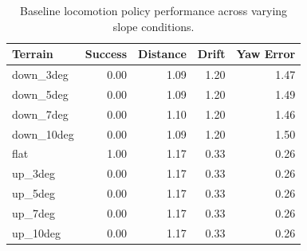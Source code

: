\begin{table}[h]
\centering
\begin{tabular}{lrrrr}
\hline
Terrain & Success & Distance & Drift & Yaw Error \\
\hline
down_3deg & 0.00 & 1.09 & 1.20 & 1.47 \\
down_5deg & 0.00 & 1.09 & 1.20 & 1.49 \\
down_7deg & 0.00 & 1.10 & 1.20 & 1.46 \\
down_10deg & 0.00 & 1.09 & 1.20 & 1.50 \\
flat & 1.00 & 1.17 & 0.33 & 0.26 \\
up_3deg & 0.00 & 1.17 & 0.33 & 0.26 \\
up_5deg & 0.00 & 1.17 & 0.33 & 0.26 \\
up_7deg & 0.00 & 1.17 & 0.33 & 0.26 \\
up_10deg & 0.00 & 1.17 & 0.33 & 0.26 \\
\hline
\end{tabular}
\caption{Baseline locomotion policy performance across varying slope conditions.}
\label{tab:baseline_slope_results}
\end{table}
